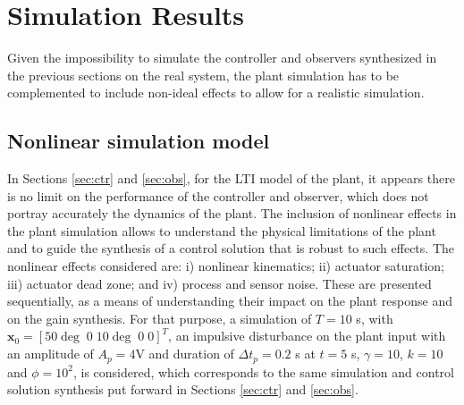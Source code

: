\documentclass[letterpaper, 10 pt, conference]{ieeeconf}
\begin{document}

\section{Simulation Results}\label{sec:sim}
Given the impossibility to simulate the controller and observers synthesized in the previous sections on the real system, the plant simulation has to be complemented to include non-ideal effects to allow for a realistic simulation. 

\subsection{Nonlinear simulation model} \label{sec:nonlin}
In Sections \ref{sec:ctr} and \ref{sec:obs}, for the LTI model of the plant, it appears there is no limit on the performance of the controller and observer, which does not portray accurately the dynamics of the plant. The inclusion of nonlinear effects in the plant simulation allows to understand the physical limitations of the plant and to guide the synthesis of a control solution that is robust to such effects. The nonlinear effects considered are: i) nonlinear kinematics; ii) actuator saturation; iii) actuator dead zone; and iv) process and sensor noise. These are presented sequentially, as a means of understanding their impact on the plant response and on the gain synthesis. For that purpose, a simulation of $T = 10$ s, with $\mathbf{x}_0 = [50\deg\;0 \;10\deg\; 0 \;0]^T$, an impulsive disturbance on the plant input with an amplitude of $A_p = 4$V and duration of $\Delta t_p = 0.2$ s at $t = 5$ s,  $\gamma = 10$, $k =10$ and $\phi = 10^2$, is considered, which corresponds to the same simulation and control solution synthesis put forward in Sections \ref{sec:ctr} and \ref{sec:obs}.
\end{document}
